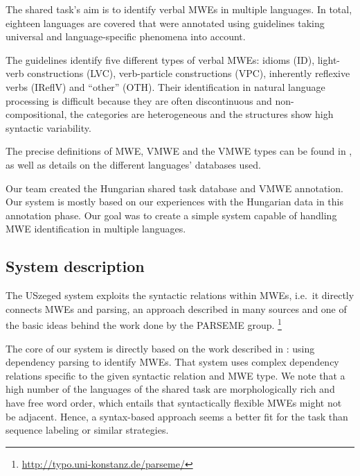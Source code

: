 \documentclass[output=paper,
modfonts,
]{langscibook}
\begin{document}
The shared task's aim is to identify verbal MWEs in multiple languages. In total, eighteen languages are covered that were annotated using guidelines taking universal and language-specific phenomena into account. 

The guidelines identify five different types of verbal MWEs: idioms (ID), light-verb constructions (LVC), verb-particle constructions (VPC), inherently reflexive verbs (IReflV) and ``other'' (OTH). Their identification in natural language processing is difficult because they are often discontinuous and non-compositional, the categories are heterogeneous and the structures show high syntactic variability. 

The precise definitions of MWE, VMWE and the VMWE types can be found in , as well as details on the different languages' databases used.

Our team created the Hungarian shared task database and VMWE annotation. Our system is mostly based on our experiences with the Hungarian data in this annotation phase. Our goal was to create a simple system capable of handling MWE identification in multiple languages.

\subsection{System description}

The USzeged system exploits the syntactic relations within MWEs, i.e.~it directly connects MWEs and parsing, an approach described in many sources \citep{constant-nivre:acl:2016,nasr:acl:2015,candito-constant:acl:2014,green:emnlp:2011,Green:2013:PMI:2464100.2464109,Wehrlietal10,Waszczuk2016} and one of the basic ideas behind the work done by the PARSEME group. \footnote{\url{http://typo.uni-konstanz.de/parseme/}}

The core of our system is directly based on the work described in \cite{hulvc}: using dependency parsing to identify MWEs. That system uses complex dependency relations specific to the given syntactic relation and MWE type. We note that a high number of the languages of the shared task are morphologically rich and have free word order, which entails that syntactically flexible MWEs might not be adjacent. Hence, a syntax-based approach seems a better fit for the task than sequence labeling or similar strategies. 

\end{document}
